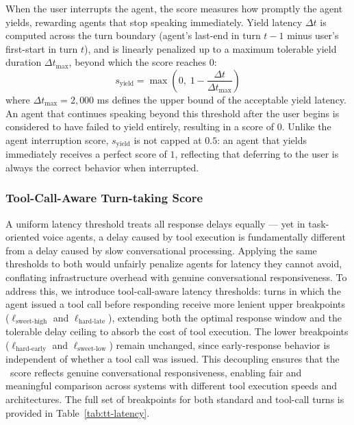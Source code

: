 When the user interrupts the agent, the score measures how promptly 
the agent yields, rewarding agents that stop speaking immediately. 
Yield latency $\Delta t$ is computed across the turn boundary 
(agent's last-end in turn $t{-}1$ minus user's first-start in turn $t$), and is linearly penalized up to a maximum tolerable yield duration $\Delta t_{\max}$, beyond which the score reaches $0$:
%
\begin{equation}
    s_{\text{yield}} = \max\!\left(0,\; 1 - \frac{\Delta t}{\Delta t_{\max}}\right)
\end{equation}
%
where $\Delta t_{\max} = 2{,}000$ ms defines the upper bound of 
the acceptable yield latency. An agent that continues speaking beyond this threshold after the user begins is considered to have failed to yield entirely, resulting in a score of 0. Unlike the agent interruption score, 
$s_{\text{yield}}$ is not capped at $0.5$: an agent that yields 
immediately receives a perfect score of $1$, reflecting that deferring to the user is always the correct behavior when interrupted.

\subsubsection*{Tool-Call-Aware Turn-taking Score}
\label{app:tool-aware-turn-taking}
A uniform latency threshold treats all response delays equally --- yet in task-oriented voice agents, a delay caused by tool execution is fundamentally different from a delay caused by slow conversational processing. Applying the same thresholds to both would unfairly penalize agents for latency they cannot avoid, conflating infrastructure overhead with genuine conversational responsiveness. To address this, we introduce tool-call-aware latency thresholds: turns in which the agent issued a tool call before responding receive more lenient upper breakpoints ($\ell_{\text{sweet-high}}$ and $\ell_{\text{hard-late}}$), extending both the optimal response window and the tolerable delay ceiling to absorb the cost of tool execution. The lower breakpoints ($\ell_{\text{hard-early}}$ and 
$\ell_{\text{sweet-low}}$) remain unchanged, since early-response behavior is independent of whether a tool call was issued. This decoupling ensures that the \metricturntaking~score reflects genuine conversational responsiveness, enabling fair and meaningful comparison across systems with different tool execution speeds and architectures. The full set of breakpoints for both standard and tool-call turns is provided in Table~\ref{tab:tt-latency}.

